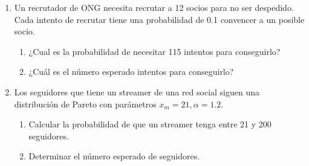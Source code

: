 \documentclass[]{article}
\theoremstyle{plain}
\theoremstyle{definition}
\theoremstyle{definition} %
\begin{document}
\begin{enumerate}
  \item Un recrutador de ONG necesita recrutar a 12 socios para no ser despedido.  
  Cada intento de recrutar tiene una probabilidad de  0.1 convencer a un posible socio. 
  \begin{enumerate}  
  \item ¿Cual es la probabilidad de necesitar 115 intentos para conseguirlo?
  \item ¿Cuál es el número esperado intentos para conseguirlo?  
  \end{enumerate}

  \item   Los seguidores que tiene un streamer de una red social siguen una distribución de Pareto 
  con parámetros $x_m = 21, \alpha = 1.2$. 
  \begin{enumerate}
    \item Calcular la probabilidad de que un streamer tenga  entre 21 y 200 seguidores.
    \item Determinar el número esperado de seguidores.
  \end{enumerate}
 
 
\end{enumerate}
\end{document}
